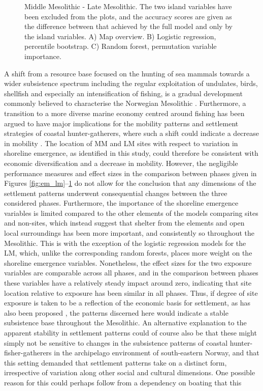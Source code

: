 \documentclass[12pt, a4paper]{article}
\begin{document}
\begin{figure}
	\caption[Middle Mesolithic- Late Mesolithic]{Middle Mesolithic - Late Mesolithic. The two island variables have been excluded from the plots, and the accuracy scores are given as the difference between that achieved by the full model and only by the island variables. A) Map overview. B) Logistic regression, percentile bootstrap. C) Random forest, permutation variable importance.}
	\label{fig:mm_lm}
\end{figure}

A shift from a resource base focused on the hunting of sea mammals towards a wider subsistence spectrum including the regular exploitation of undulates, birds, shellfish and especially an intensification of fishing, is a gradual development commonly believed to characterise the Norwegian Mesolithic \citep[see][]{breivik2014, bjerck2016, ritchie2016, jorgensen2020, mjaerum2020}. Furthermore, a transition to a more diverse marine economy centred around fishing has been argued to have major implications for the mobility patterns and settlement strategies of coastal hunter-gatherers, where such a shift could indicate a decrease in mobility \citep[e.g.][]{boethius2017, boethius2018, jorgensen2020}. The location of MM and LM sites with respect to variation in shoreline emergence, as identified in this study, could therefore be consistent with economic diversification and a decrease in mobility. However, the negligible performance measures and effect sizes in the comparison between phases given in Figures \ref{fig:em_lm}--\ref{fig:mm_lm} do not allow for the conclusion that any dimensions of the settlement patterns underwent consequential changes between the three considered phases. Furthermore, the importance of the shoreline emergence variables is limited compared to the other elements of the models comparing sites and non-sites, which instead suggest that shelter from the elements and open local surroundings has been more important, and consistently so throughout the Mesolithic. This is with the exception of the logistic regression models for the LM, which, unlike the corresponding random forests, places more weight on the shoreline emergence variables. Nonetheless, the effect sizes for the two exposure variables are comparable across all phases, and in the comparison between phases these variables have a relatively steady impact around zero, indicating that site location relative to exposure has been similar in all phases. Thus, if degree of site exposure is taken to be a reflection of the economic basis for settlement, as has also been proposed \citep{bjeck2009, breivik2014}, the patterns discerned here would indicate a stable subsistence base throughout the Mesolithic. An alternative explanation to the apparent stability in settlement patterns could of course also be that these might simply not be sensitive to changes in the subsistence patterns of coastal hunter-fisher-gatherers in the archipelago environment of south-eastern Norway, and that this setting demanded that settlement patterns take on a distinct form, irrespective of variation along other social and cultural dimensions. One possible reason for this could perhaps follow from a dependency on boating that this 
\end{document}
